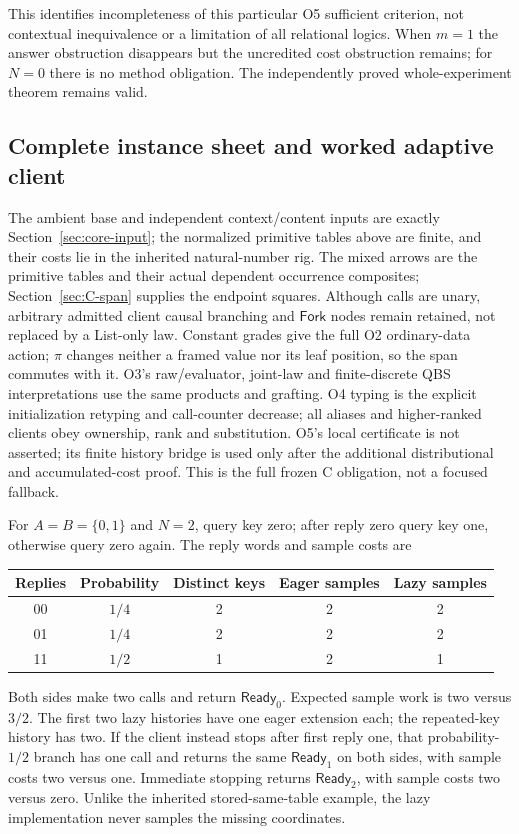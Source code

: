 \documentclass[11pt,a4paper]{article}
\theoremstyle{definition}
\begin{document}
This identifies incompleteness of this particular O5 sufficient
criterion, not contextual inequivalence or a limitation of all relational
logics. When $m=1$ the answer obstruction disappears but the uncredited
cost obstruction remains; for $N=0$ there is no method obligation.
The independently proved whole-experiment theorem remains valid.

\subsection{Complete instance sheet and worked adaptive client}
The ambient base and independent context/content inputs are exactly
Section~\ref{sec:core-input}; the normalized primitive tables above are
finite, and their costs lie in the inherited natural-number rig.
The mixed arrows are the primitive tables and their actual dependent
occurrence composites; Section~\ref{sec:C-span} supplies the endpoint
squares. Although calls are unary, arbitrary admitted client causal
branching and $\mathsf{Fork}$ nodes remain retained, not replaced by a
List-only law. Constant grades give the full O2 ordinary-data action;
$\pi$ changes neither a framed value nor its leaf position, so the span
commutes with it. O3's raw/evaluator, joint-law and finite-discrete QBS
interpretations use the same products and grafting. O4 typing is the
explicit initialization retyping and call-counter decrease; all aliases
and higher-ranked clients obey ownership, rank and substitution. O5's
local certificate is not asserted; its finite history bridge is used
only after the additional distributional and accumulated-cost proof.
This is the full frozen C obligation, not a focused fallback.

For $A=B=\{0,1\}$ and $N=2$, query key zero; after reply zero query key
one, otherwise query zero again. The reply words and sample costs are
\begin{center}
\begin{tabular}{@{}ccccc@{}}
\toprule Replies&Probability&Distinct keys&Eager samples&Lazy samples\\\midrule
00&$1/4$&2&2&2\\
01&$1/4$&2&2&2\\
11&$1/2$&1&2&1\\
\bottomrule
\end{tabular}
\end{center}
Both sides make two calls and return $\mathsf{Ready}_0$. Expected sample
work is two versus $3/2$. The first two lazy histories have one eager
extension each; the repeated-key history has two. If the client instead
stops after first reply one, that probability-$1/2$ branch has one call
and returns the same $\mathsf{Ready}_1$ on both sides, with sample costs
two versus one. Immediate stopping returns $\mathsf{Ready}_2$, with
sample costs two versus zero. Unlike the inherited stored-same-table
example, the lazy implementation never samples the missing coordinates.
\end{document}
